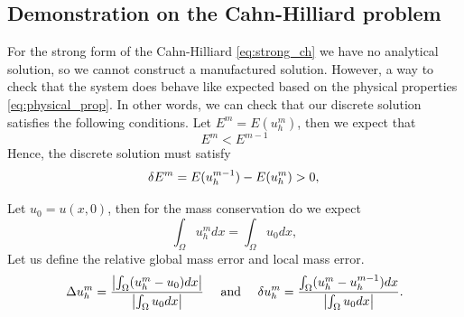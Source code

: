 \subsection{Demonstration on the Cahn-Hilliard problem}%
\label{sub:demonstration_on_the_physical_cahn_hilliard}

For the strong form of the Cahn-Hilliard \eqref{eq:strong_ch} we have no analytical solution, so we cannot construct a manufactured solution. However, a way to check that the system does behave like expected based on the physical properties \eqref{eq:physical_prop}. In other
words, we can check that our discrete solution satisfies the following conditions. Let $E^m = E( u_{h}^{m})$, then we expect that
\begin{equation}
 E^m   <  E^{ m-1 }
\end{equation}
Hence, the discrete solution must satisfy
\begin{equation}
 \delta E^{m} = E( u_{h}^{m-1}) -  E( u_{h}^{m}) > 0,  \\
\end{equation}

Let $u_{0} = u( x,0) $, then for the mass conservation do we expect
\begin{equation}
\int_{\Omega }^{} u_{h}^{m}   dx = \int_{\Omega }^{} u_{0}  dx,
\end{equation}
 Let us define the relative global mass error and local mass error.
 \begin{equation}
 \Delta u_{h}^{m}  = \frac{ \left\lvert  \int_{\Omega }^{}  ( u_h^{m} - u_{0} ) dx  \right\rvert }{ \left\lvert  \int_{\Omega }^{}  u_{0} dx  \right\rvert } \quad \text{ and } \quad
 \delta u_{h}^{m}  = \frac{  \int_{\Omega }^{}  ( u_h^{m} - u^{m-1}_{h} ) dx  }{ \left\lvert  \int_{\Omega }^{}  u_{0} dx  \right\rvert }.
 \end{equation}

